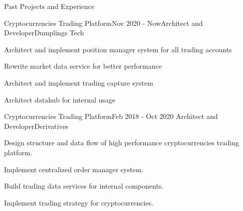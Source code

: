 \documentclass{resume} %
\begin{document}
\begin{rSection}{Past Projects and Experience}

\begin{rSubsection}{Cryptocurrencies Trading Platform}{Nov 2020 - Now}{Architect and Developer}{Dumplings Tech}
\begin{rSubsectionList}
\item Architect and implement position manager system for all trading accounts
\item Rewrite market data service for better performance
\item Architect and implement trading capture system
\item Architect datahub for internal usage
\end{rSubsectionList}
\end{rSubsection}

\begin{rSubsection}{Cryptocurrencies Trading Platform}{Feb 2018 - Oct 2020 }{Architect and Developer}{Derivatives}
\begin{rSubsectionList}
\item Design structure and data flow of high performance cryptocurrencies trading platform.
\item Implement centralized order manager system.
\item Build trading data services for internal components.
\item Implement trading strategy for cryptocurrencies.
\end{rSubsectionList}
\end{rSubsection}







\end{rSection}
\end{document}
